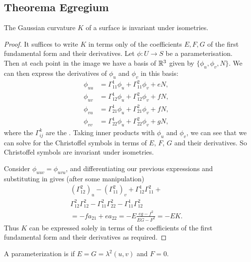 \documentclass[10pt]{article}
\begin{document}
\subsection{Theorema Egregium}

\begin{theorem}
    The Gaussian curvature $K$ of a surface is invariant under isometries.
\end{theorem}
\begin{proof}
    It suffices to write $K$ in terms only of the coefficients $E, F, G$ of the first fundamental form and their derivatives. Let $\phi: U \rightarrow S$ be a parameterisation. Then at each point in the image we have a basis of $\mathbb{R}^3$ given by $\{\phi_u, \phi_v, N\}$. We can then express the derivatives of $\phi_u$ and $\phi_v$ in this basis:
    \begin{align*}
            \phi_{u u} & =\Gamma_{11}^1 \phi_u+\Gamma_{11}^2 \phi_v+e N, \\
            \phi_{u v} & =\Gamma_{12}^1 \phi_u+\Gamma_{12}^2 \phi_v+f N, \\
            \phi_{v u} & =\Gamma_{21}^1 \phi_u+\Gamma_{21}^2 \phi_v+f N, \\
            \phi_{v v} & =\Gamma_{22}^1 \phi_u+\Gamma_{22}^2 \phi_v+g N,
    \end{align*}
    where the $\Gamma_{ij}^k$ are the .
    Taking inner products with $\phi_u$ and $\phi_v$, we can see that we can solve for the Christoffel symbols in terms of $E$, $F$, $G$ and their derivatives. So Christoffel symbols are invariant under isometries.

    Consider $\phi_{uuv} = \phi_{uvu}$, and differentiating our previous expressions and substituting in gives (after some manipulation)
    \begin{align*}
            \left(\Gamma_{12}^2\right)_u  -\left(\Gamma_{11}^2\right)_v+
            \Gamma_{12}^1 \Gamma_{11}^2+\\
            \Gamma_{12}^2 \Gamma_{12}^2-\Gamma_{11}^2 \Gamma_{22}^2-\Gamma_{11}^1 \Gamma_{12}^2 \\
             =-f a_{21}+e a_{22}=-E \frac{e g-f^2}{E G-F^2}=-E K .
    \end{align*}
    Thus $K$ can be expressed solely in terms of the coefficients of the first fundamental form and their derivatives as required.
\end{proof}


\begin{definition}
    A parameterization is  if $E = G  = \lambda^2(u, v)$ and $F = 0$.
\end{definition}
\end{document}
